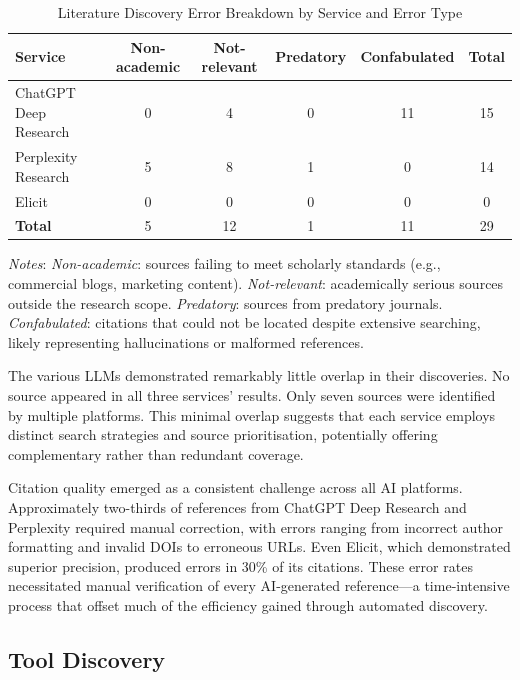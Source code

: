 \begin{table}[h]
\centering
\caption{Literature Discovery Error Breakdown by Service and Error Type}
\label{tab:literature-errors}
\begin{tabular}{lccccc}
\toprule
\textbf{Service} & \textbf{Non-academic} & \textbf{Not-relevant} & \textbf{Predatory} & \textbf{Confabulated} & \textbf{Total} \\
\midrule
ChatGPT Deep Research & 0 & 4 & 0 & 11 & 15 \\
Perplexity Research & 5 & 8 & 1 & 0 & 14 \\
Elicit & 0 & 0 & 0 & 0 & 0 \\
\midrule
\textbf{Total} & 5 & 12 & 1 & 11 & 29 \\
\bottomrule
\end{tabular}
\smallskip
{\small \textit{Notes}: \textit{Non-academic}: sources failing to meet scholarly standards (e.g., commercial blogs, marketing content). \textit{Not-relevant}: academically serious sources outside the research scope. \textit{Predatory}: sources from predatory journals. \textit{Confabulated}: citations that could not be located despite extensive searching, likely representing hallucinations or malformed references.}
\end{table}

The various LLMs demonstrated remarkably little overlap in their discoveries. No source appeared in all three services' results. Only seven sources were identified by multiple platforms. This minimal overlap suggests that each service employs distinct search strategies and source prioritisation, potentially offering complementary rather than redundant coverage.

Citation quality emerged as a consistent challenge across all AI platforms. Approximately two-thirds of references from ChatGPT Deep Research and Perplexity required manual correction, with errors ranging from incorrect author formatting and invalid DOIs to erroneous URLs. Even Elicit, which demonstrated superior precision, produced errors in 30\% of its citations. These error rates necessitated manual verification of every AI-generated reference---a time-intensive process that offset much of the efficiency gained through automated discovery.


\subsection{Tool Discovery}
\label{sec:tool-discovery}

